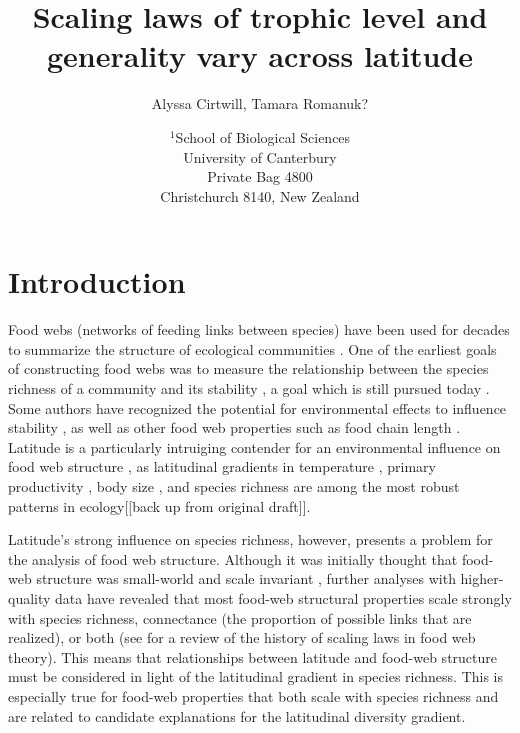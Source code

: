 \documentclass[12pt]{article}
\title{Scaling laws of trophic level and generality vary across latitude}
\author{Alyssa Cirtwill, Tamara Romanuk?}
\date{$^1$School of Biological Sciences\\University of Canterbury\\
Private Bag 4800\\Christchurch 8140, New Zealand}
\begin{document}
\maketitle
\baselineskip=8.5mm
 
\vspace{0.4 in}


\section*{Introduction}

Food webs (networks of feeding links between species) have been used for decades to summarize the structure of ecological communities \citep{Williams2000,earlierwork}.
One of the earliest goals of constructing food webs was to measure the relationship between the species richness of
a community and its stability \citep{Dunne2006}, a goal which is still pursued today \citep{robustness studies}.
Some authors have recognized the potential for environmental effects to influence stability \citep{Shurin2007}, as well as other food web properties such as food chain length \citep{Townsend1998,Thompson2003,2004c,Young2013,Digel2014}.
Latitude is a particularly intruiging contender for an environmental influence on food web structure \citep{Shurin2007},
as latitudinal gradients in temperature \citep{}, primary productivity \citep{}, body size \citep{}, and 
species richness \citep{Schemske2009a} are among the most robust patterns in ecology[[back up from original draft]]. 


Latitude's strong influence on species richness, however, presents a problem for the analysis of food web structure.
Although it was initially thought that food-web structure was small-world and scale invariant \citep{}, further 
analyses with higher-quality data have revealed that most food-web structural properties scale strongly with species 
richness, connectance (the proportion of possible links that are realized), or both \citep{Riede2010} 
(see \citet{Dunne2006} for a review of the history of scaling laws in food web theory). This means that relationships
between latitude and food-web structure must be considered in light of the latitudinal gradient in species richness.
This is especially true for food-web properties that both scale with species richness and are related to candidate
explanations for the latitudinal diversity gradient.
\end{document}
